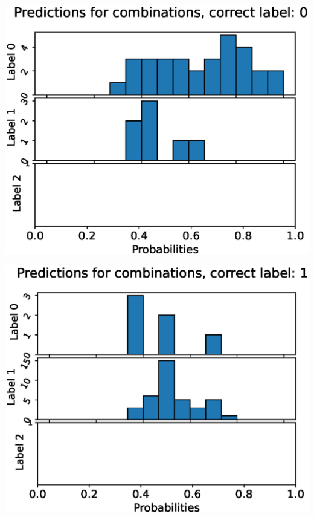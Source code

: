 \begin{center}
\begin{minipage}{0.33\textwidth}
  \includegraphics[width=\textwidth]{files/figs/app/hists/femval/pc0.eps}
\end{minipage}%
\begin{minipage}{0.33\textwidth}
  \includegraphics[width=\textwidth]{files/figs/app/hists/femval/pc1.eps}
\end{minipage}%
\begin{minipage}{0.33\textwidth}

\end{minipage}
\end{center}
